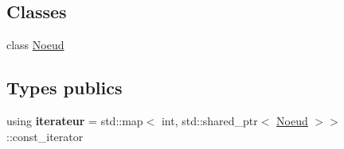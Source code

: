 \subsection*{Classes}
\begin{DoxyCompactItemize}
\item 
class \hyperlink{classMemArbre_1_1Noeud}{Noeud}
\end{DoxyCompactItemize}
\subsection*{Types publics}
\begin{DoxyCompactItemize}
\item 
using {\bfseries iterateur} = std\+::map$<$ int, std\+::shared\+\_\+ptr$<$ \hyperlink{classMemArbre_1_1Noeud}{Noeud} $>$$>$\+::const\+\_\+iterator\hypertarget{classMemArbre_a4f15f8cc13e7c9e0909b803e6d995cac}{}\label{classMemArbre_a4f15f8cc13e7c9e0909b803e6d995cac}

\end{DoxyCompactItemize}
